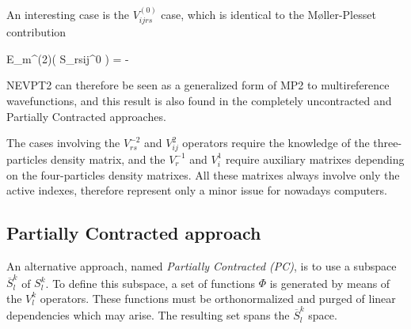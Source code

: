 An interesting case is the $V_{ijrs}^{(0)}$ case, which is identical to the
M{\o}ller-Plesset contribution 

\beq
E_m^{(2)}\left( S_{rsij}^{0} \right) = - 
\eeq

NEVPT2 can therefore be seen as a generalized form of MP2 to multireference
wavefunctions, and this result is also found in the completely uncontracted
and Partially Contracted approaches\cite{cpl-317-472-2000}.

The cases involving the $V_{rs}^{-2}$  and $V_{ij}^{2}$ operators require
the knowledge of the three-particles density matrix, and the $V_{r}^{-1}$
and $V_{i}^{1}$ require auxiliary matrixes depending on the four-particles
density matrixes. All these matrixes always involve only the active indexes,
therefore represent only a minor issue for nowadays computers.

\subsection*{Partially Contracted approach}

An alternative approach, named \textit{Partially Contracted
(PC)}, is to use a subspace $\overline{S}_l^k$ of $S_l^k$.
To define this subspace, a set of functions $\Phi$ is generated by means of
the $V_l^k$ operators. These functions must be orthonormalized and purged of
linear dependencies which may arise. The resulting set spans the
$\overline{S}_l^k$ space.

